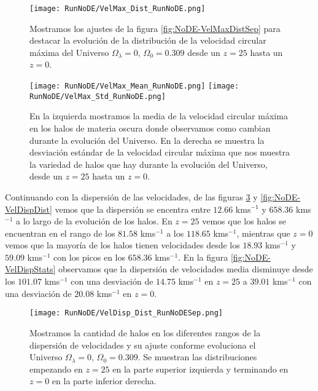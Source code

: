\begin{figure}[H]
    \centering
    \texttt{[image: RunNoDE/VelMax\_Dist\_RunNoDE.png]}
    \caption[Distribución de la velocidad circular máxima]{\footnotesize Mostramos los ajustes de la figura \ref{fig:NoDE-VelMaxDistSep} para destacar la evolución de la distribución de la velocidad circular máxima del Universo $\Omega_\lambda = 0$, $\Omega_0 = 0.309$ desde un $z=25$ hasta un $z=0$.}
    \label{fig:NoDE-VelMaxDist}
\end{figure}

\begin{figure}[H]
    \centering
    \texttt{[image: RunNoDE/VelMax\_Mean\_RunNoDE.png]}
    \texttt{[image: RunNoDE/VelMax\_Std\_RunNoDE.png]}
    \caption[Media y desviación estándar de la velocidad circular máxima]{\footnotesize En la izquierda mostramos la media de la velocidad circular máxima en los halos de materia oscura donde observamos como cambian durante la evolución del Universo. En la derecha se muestra la desviación estándar de la velocidad circular máxima que nos muestra la variedad de halos que hay durante la evolución del Universo, desde un $z=25$ hasta un $z=0$.}
    \label{fig:NoDE-VelMaxStats}
\end{figure}

Continuando con la dispersión de las velocidades, de las figuras \ref{fig:NoDE-VelDispDistSep} y \ref{fig:NoDE-VelDispDist} vemos que la dispersión se encentra entre $12.66$ kms$^{-1}$ y $658.36$ kms$^{-1}$ a lo largo de la evolución de los halos. En $z=25$ vemos que los halos se encuentran en el rango de los $81.58$ kms$^{-1}$ a los $118.65$ kms$^{-1}$, mientras que $z=0$ vemos que la mayoría de los halos tienen velocidades desde los $18.93$ kms$^{-1}$ y $59.09$ kms$^{-1}$ con los picos en los $658.36$ kms$^{-1}$. En la figura \ref{fig:NoDE-VelDispStats} observamos que la dispersión de velocidades media disminuye desde los $101.07$ kms$^{-1}$ con una desviación de $14.75$ kms$^{-1}$ en $z=25$ a $39.01$ kms$^{-1}$ con una desviación de $20.08$ kms$^{-1}$ en $z=0$.

\begin{figure}[H]
    \centering
    \texttt{[image: RunNoDE/VelDisp\_Dist\_RunNoDESep.png]}
    \caption[Dispersión de velocidades]{\footnotesize Mostramos la cantidad de halos en los diferentes rangos de la dispersión de velocidades y su ajuste conforme evoluciona el Universo $\Omega_\lambda = 0$, $\Omega_0 = 0.309$. Se muestran las distribuciones empezando en $z=25$ en la parte superior izquierda y terminando en $z=0$ en la parte inferior derecha.}
    \label{fig:NoDE-VelDispDistSep}
\end{figure}


